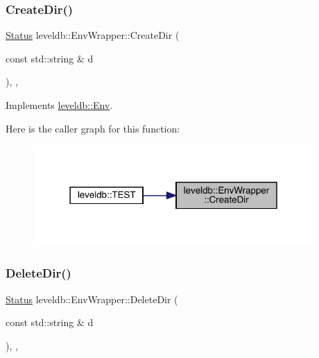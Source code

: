 \subsubsection{\texorpdfstring{CreateDir()}{CreateDir()}}
{\footnotesize\ttfamily \mbox{\hyperlink{classleveldb_1_1_status}{Status}} leveldb\+::\+Env\+Wrapper\+::\+Create\+Dir (\begin{DoxyParamCaption}\item[{const std\+::string \&}]{d }\end{DoxyParamCaption})\hspace{0.3cm}{\ttfamily [inline]}, {\ttfamily [override]}, {\ttfamily [virtual]}}



Implements \mbox{\hyperlink{classleveldb_1_1_env_ae6b7c8122df5a8020b2a3439ac39646e}{leveldb\+::\+Env}}.

Here is the caller graph for this function\+:
\nopagebreak
\begin{figure}[H]
\begin{center}
\leavevmode
\includegraphics[width=303pt]{classleveldb_1_1_env_wrapper_a33a6d66b4d8791828e8b4e36ae3948a3_icgraph}
\end{center}
\end{figure}
\mbox{\label{classleveldb_1_1_env_wrapper_a819f58dc05225852813c0b7440edd719}} 
\subsubsection{\texorpdfstring{DeleteDir()}{DeleteDir()}}
{\footnotesize\ttfamily \mbox{\hyperlink{classleveldb_1_1_status}{Status}} leveldb\+::\+Env\+Wrapper\+::\+Delete\+Dir (\begin{DoxyParamCaption}\item[{const std\+::string \&}]{d }\end{DoxyParamCaption})\hspace{0.3cm}{\ttfamily [inline]}, {\ttfamily [override]}, {\ttfamily [virtual]}}



